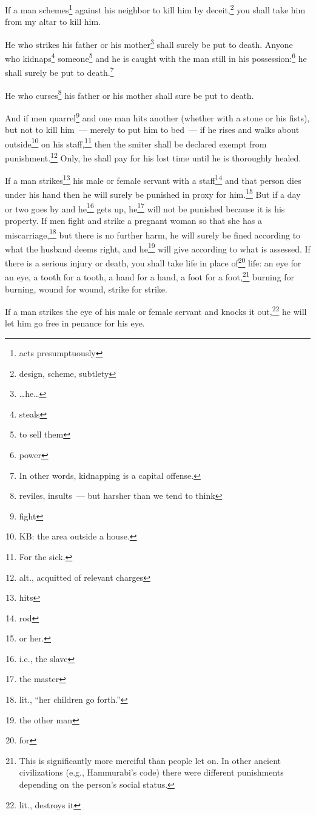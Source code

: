 \begin{inparaenum}
     If a man schemes\footnote{acts presumptuously} against his neighbor to kill him by deceit,\footnote{design, scheme, subtlety} you shall take him from my altar to kill him.%
    
     He who strikes his father or his mother\footnote{\dots he\dots} shall surely be put to death.%
     Anyone who kidnaps\footnote{steals} someone\footnote{to sell them} and he is caught with the man still in his possession:\footnote{power} he shall surely be put to death.\footnote{In other words, kidnapping is a capital offense.}%
    
     He who curses\footnote{reviles, insults~--- but harsher than we tend to think} his father or his mother shall sure be put to death.%
    
     And if men quarrel\footnote{fight} and one man hits another (whether with a stone or his fists), but not to kill him~--- merely to put him to bed~---%
     if he rises and walks about outside\footnote{KB: the area outside a house.} on his staff,\footnote{For the sick.} then the smiter shall be declared exempt from punishment.\footnote{alt., acquitted of relevant charges} Only, he shall pay for his lost time until he is thoroughly healed.%
    
     If a man strikes\footnote{hits} his male or female servant with a staff\footnote{rod} and that person dies under his hand then he will surely be punished in proxy for him.\footnote{or her.}%
     But if a day or two goes by and he\footnote{i.e., the slave} gets up, he\footnote{the master} will not be punished because it is his property.%
     If men fight and strike a pregnant woman so that she has a miscarriage,\footnote{lit., ``her children go forth.''} but there is no further harm, he will surely be fined according to what the husband deems right, and he\footnote{the other man} will give according to what is assessed.%
     If there is a serious injury or death, you shall take life in place of\footnote{for} life:%
     an eye for an eye, a tooth for a tooth, a hand for a hand, a foot for a foot,\footnote{This is significantly more merciful than people let on. In other ancient civilizations (e.g., Hammurabi's code) there were different punishments depending on the person's social status.}%
     burning for burning, wound for wound, strike for strike.%
    
     If a man strikes the eye of his male or female servant and knocks it out,\footnote{lit., destroys it} he will let him go free in penance for his eye.%
    

\end{inparaenum}
